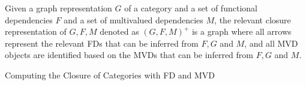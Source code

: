   



\begin{definition} 
Given a graph representation $G$ of a category and a set of functional dependencies $F$ and  a set of multivalued dependencies $M$, the relevant closure representation of  $G, F, M$ denoted as $(G,F,M)^+$ is a graph where all arrows represent the relevant FDs that can be inferred from $F,G$ and $M$, and all MVD objects are identified based on the MVDs that can be inferred from $F,G$ and $M$.

\end{definition}





\begin{algorithm}
\caption{Computing the Closure of Categories with FD and MVD}
\label{alg:closureMVD}

\end{algorithm}



